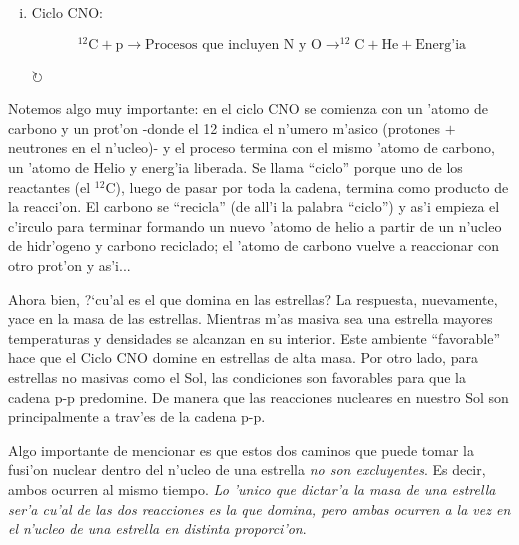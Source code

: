 \documentclass{article}
\begin{document}
\begin{enumerate}[a)]
\begin{enumerate} [i)]
(Notar que un hidr'ogeno ionizado es lo mismo que un prot'on, es decir $1 \ \text{H}^+ = 1\ \text{p}$).

\textit{En resumen, se comienza con 4 protones y se termina con un 'atomo de Helio m'as energ'ia.}

\item Ciclo CNO:


\begin{equation} \label{CNO_cycle}
^{12}\text{C} + \text{p} \rightarrow \text{Procesos que incluyen N y O} \rightarrow ^{12}\text{C} + \text{He} + \text{Energ'ia}
\end{equation}

\begin{center}
{\Huge $\circlearrowright$}
\end{center}
\end{enumerate}

Notemos algo muy importante: en el ciclo CNO se comienza con un 'atomo de carbono y un prot'on -donde el 12 indica el n'umero m'asico (protones $+$ neutrones en el n'ucleo)- y el proceso termina con el mismo 'atomo de carbono, un 'atomo de Helio y energ'ia liberada. Se llama ``ciclo'' porque uno de los reactantes (el $^{12}\text{C}$), luego de pasar por toda la cadena, termina como producto de la reacci'on. El carbono se ``recicla'' (de all'i la palabra ``ciclo'') y as'i empieza el c'irculo para terminar formando un nuevo 'atomo de helio a partir de un n'ucleo de hidr'ogeno y carbono reciclado; el 'atomo de carbono vuelve a reaccionar con otro prot'on y as'i...

\vspace{2mm}

Ahora bien, ?`cu'al es el que domina en las estrellas? La respuesta, nuevamente, yace en la masa de las estrellas. Mientras m'as masiva sea una estrella mayores temperaturas y densidades se alcanzan en su interior. Este ambiente ``favorable'' hace que el Ciclo CNO domine en estrellas de alta masa. Por otro lado, para estrellas no masivas como el Sol, las condiciones son favorables para que la cadena p-p predomine. De manera que las reacciones nucleares en nuestro Sol son principalmente a trav'es de la cadena p-p.

Algo importante de mencionar es que estos dos caminos que puede tomar la fusi'on nuclear dentro del n'ucleo de una estrella \emph{no son excluyentes}. Es decir, ambos ocurren al mismo tiempo. \emph{Lo 'unico que dictar'a la masa de una estrella ser'a cu'al de las dos reacciones es la que domina, pero ambas ocurren a la vez en el n'ucleo de una estrella en distinta proporci'on}.
\end{enumerate}
\end{document}
